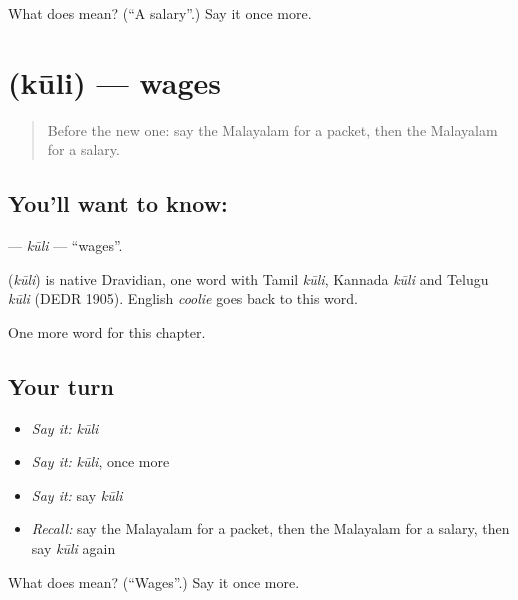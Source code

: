 \begin{tcolorbox}[breakable,colback=teal!4,colframe=teal!35!black,title={Before you move on}]
What does  mean? (\textquotedblleft{}A salary\textquotedblright{}.) Say it once more.
\end{tcolorbox}
\section[\texorpdfstring{\ml{കൂലി} (kūli)}{കൂലി (kūli)}]{ (kūli) — wages}

\label{lesson:ML-C298-kuli}



\begin{quote}
Before the new one: say the Malayalam for a packet, then the Malayalam for a salary.
\end{quote}

\subsection*{You'll want to know: }
\textbf{} — \emph{kūli} — \textquotedblleft{}wages\textquotedblright{}.

\begin{cousinweb}
\textbf{} (\emph{kūli}) is native Dravidian, one word with Tamil \emph{kūli}, Kannada \emph{kūli} and Telugu \emph{kūli} (DEDR 1905). English \emph{coolie} goes back to this word.
\end{cousinweb}

\begin{grammarlens}[title={What you've built}]
One more word for this chapter.
\end{grammarlens}

\subsection*{Your turn}
\begin{itemize}
\raggedright
  \item \emph{Say it:} \emph{kūli}
  \item \emph{Say it:} \emph{kūli}, once more
  \item \emph{Say it:} say \emph{kūli}
  \item \emph{Recall:} say the Malayalam for a packet, then the Malayalam for a salary, then say \emph{kūli} again
\end{itemize}

\begin{tcolorbox}[breakable,colback=teal!4,colframe=teal!35!black,title={Before you move on}]
What does  mean? (\textquotedblleft{}Wages\textquotedblright{}.) Say it once more.
\end{tcolorbox}
